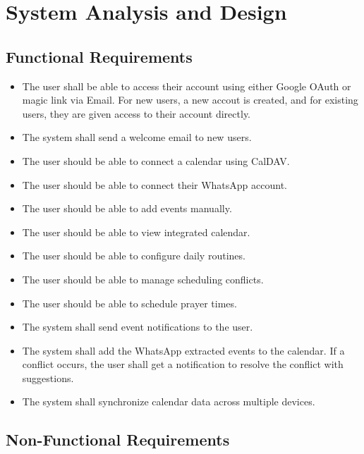 \documentclass[12pt,a4paper]{report}
\begin{document}
\chapter{System Analysis and Design}

\section{Functional Requirements}

\begin{itemize}
    \item The user shall be able to access their account using either Google OAuth or magic link via Email. For new users, a new accout is created, and for existing users, they are given access to their account directly.
    \item The system shall send a welcome email to new users.
    \item The user should be able to connect a calendar using CalDAV.
    \item The user should be able to connect their WhatsApp account.
    \item The user should be able to add events manually.
    \item The user should be able to view integrated calendar.
    \item The user should be able to configure daily routines.
    \item The user should be able to manage scheduling conflicts.
    \item The user should be able to schedule prayer times.
    \item The system shall send event notifications to the user.
    \item The system shall add the WhatsApp extracted events to the calendar. If a conflict occurs, the user shall get a notification to resolve the conflict with suggestions.
    \item The system shall synchronize calendar data across multiple devices.
\end{itemize}

\section{Non-Functional Requirements}
\end{document}
